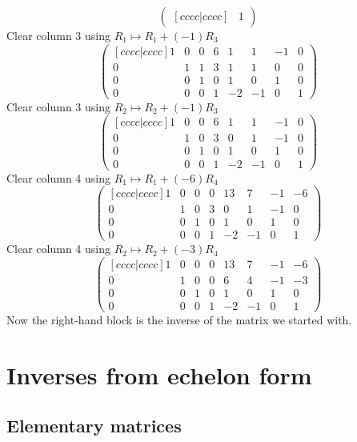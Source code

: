 \documentclass{article}
\begin{document}
\begin{Example}
\[\begin{pmatrix}[ c c c c |
c c c c ]
& 1 \end{pmatrix}\]Clear column 3 using \(R_1\mapsto
R_1+(-1)R_3\)\[\begin{pmatrix}[ c c c c | c c c c ] 1 & 0 & 0 & 6 &
1 & 1 & -1 & 0 \\ 0 & 1 & 1 & 3 & 1 & 1 & 0 & 0 \\ 0 & 0 & 1 & 0 & 1
& 0 & 1 & 0 \\ 0 & 0 & 0 & 1 & -2 & -1 & 0 & 1 \end{pmatrix}\]Clear
column 3 using \(R_2\mapsto R_2+(-1)R_3\)\[\begin{pmatrix}[ c c c
c | c c c c ] 1 & 0 & 0 & 6 & 1 & 1 & -1 & 0 \\ 0 & 1 & 0 & 3 & 0 &
1 & -1 & 0 \\ 0 & 0 & 1 & 0 & 1 & 0 & 1 & 0 \\ 0 & 0 & 0 & 1 & -2 &
-1 & 0 & 1 \end{pmatrix}\]Clear column 4 using \(R_1\mapsto
R_1+(-6)R_4\)\[\begin{pmatrix}[ c c c c | c c c c ] 1 & 0 & 0 & 0 &
13 & 7 & -1 & -6 \\ 0 & 1 & 0 & 3 & 0 & 1 & -1 & 0 \\ 0 & 0 & 1 & 0
& 1 & 0 & 1 & 0 \\ 0 & 0 & 0 & 1 & -2 & -1 & 0 & 1
\end{pmatrix}\]Clear column 4 using \(R_2\mapsto
R_2+(-3)R_4\)\[\begin{pmatrix}[ c c c c | c c c c ] 1 & 0 & 0 & 0 &
13 & 7 & -1 & -6 \\ 0 & 1 & 0 & 0 & 6 & 4 & -1 & -3 \\ 0 & 0 & 1 & 0
& 1 & 0 & 1 & 0 \\ 0 & 0 & 0 & 1 & -2 & -1 & 0 & 1
\end{pmatrix}\]Now the right-hand block is the inverse of the matrix
we started with.


\end{Example}
\clearpage
\section{Inverses from echelon form}
\subsection{Elementary matrices}
\end{document}
